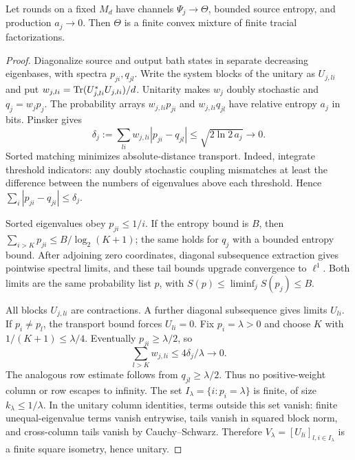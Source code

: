 \begin{lemma}\label{lem:entropy-compactness}
Let rounds on a fixed $M_d$ have channels $\Psi_j\to\Theta$, bounded source entropy, and production $a_j\to0$.
Then $\Theta$ is a finite convex mixture of finite tracial factorizations.
\end{lemma}
\begin{proof}
Diagonalize source and output bath states in separate decreasing eigenbases, with spectra $p_{ji},q_{jl}$.
Write the system blocks of the unitary as $U_{j,li}$ and put
$w_{j,li}=\operatorname{Tr}(U_{j,li}^*U_{j,li})/d$. Unitarity makes $w_j$ doubly stochastic and $q_j=w_jp_j$.
The probability arrays $w_{j,li}p_{ji}$ and $w_{j,li}q_{jl}$ have relative entropy $a_j$ in bits. Pinsker gives
\[
 \delta_j:=\sum_{li}w_{j,li}|p_{ji}-q_{jl}|\le\sqrt{2\ln2\,a_j}\longrightarrow0.
\]
Sorted matching minimizes absolute-distance transport. Indeed, integrate threshold indicators: any doubly
stochastic coupling mismatches at least the difference between the numbers of eigenvalues above each threshold.
Hence $\sum_i|p_{ji}-q_{ji}|\le\delta_j$.

Sorted eigenvalues obey $p_{ji}\le1/i$. If the entropy bound is $B$, then
$\sum_{i>K}p_{ji}\le{B/\log_2(K+1)}$; the same holds for $q_j$ with a bounded entropy bound.
After adjoining zero coordinates, diagonal subsequence extraction gives pointwise spectral limits, and these
tail bounds upgrade convergence to $\ell^1$. Both limits are the same probability list $p$, with
$S(p)\le\liminf_jS(p_j)\le B$.

All blocks $U_{j,li}$ are contractions. A further diagonal subsequence gives limits $U_{li}$.
If $p_i\ne p_l$, the transport bound forces $U_{li}=0$.
Fix $p_i=\lambda>0$ and choose $K$ with $1/(K+1)\le\lambda/4$. Eventually $p_{ji}\ge\lambda/2$, so
\[
 \sum_{l>K}w_{j,li}\le4\delta_j/\lambda\longrightarrow0.
\]
The analogous row estimate follows from $q_{jl}\ge\lambda/2$. Thus no positive-weight column or row escapes
to infinity. The set $I_\lambda=\{i:p_i=\lambda\}$ is finite, of size $k_\lambda\le1/\lambda$.
In the unitary column identities, terms outside this set vanish: finite unequal-eigenvalue terms vanish
entrywise, tails vanish in squared block norm, and cross-column tails vanish by Cauchy--Schwarz.
Therefore $V_\lambda=[U_{li}]_{l,i\in I_\lambda}$ is a finite square isometry, hence unitary.


\end{proof}
